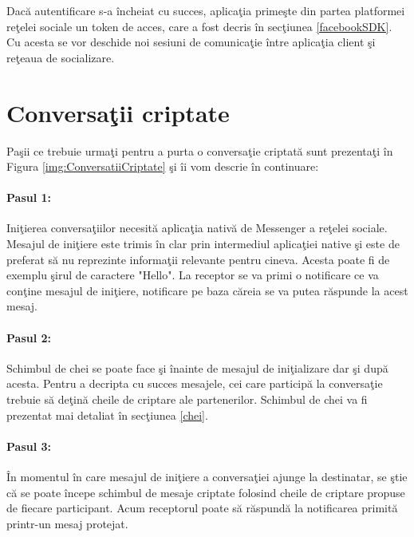 Dac\u{a} autentificare s-a \^{i}ncheiat cu succes, aplica\c{t}ia prime\c{s}te din partea platformei re\c{t}elei sociale un token de acces, care a fost decris \^{i}n sec\c{t}iunea \ref{facebookSDK}. Cu acesta se vor deschide noi sesiuni de comunica\c{t}ie \^{i}ntre aplica\c{t}ia client \c{s}i re\c{t}eaua de socializare.

\section{Conversa\c{t}ii criptate}

Pa\c{s}ii ce trebuie urma\c{t}i pentru a purta o conversa\c{t}ie criptat\u{a} sunt prezenta\c{t}i \^{i}n Figura \ref{img:ConversatiiCriptate} \c{s}i \^{i}i vom descrie \^{i}n continuare:


\paragraph{Pasul 1:}

Ini\c{t}ierea conversa\c{t}iilor necesit\u{a} aplica\c{t}ia nativ\u{a} de Messenger a re\c{t}elei sociale. Mesajul de ini\c{t}iere este trimis \^{i}n clar prin intermediul aplica\c{t}iei native \c{s}i este de preferat s\u{a} nu reprezinte informa\c{t}ii relevante pentru cineva. Acesta poate fi de exemplu \c{s}irul de caractere "Hello". La receptor se va primi o notificare ce va con\c{t}ine mesajul de ini\c{t}iere, notificare pe baza c\u{a}reia se va putea r\u{a}spunde la acest mesaj.

\paragraph{Pasul 2:}

Schimbul de chei se poate face \c{s}i \^{i}nainte de mesajul de ini\c{t}ializare dar \c{s}i dup\u{a} acesta. Pentru a decripta cu succes mesajele, cei care particip\u{a} la conversa\c{t}ie trebuie s\u{a} de\c{t}in\u{a} cheile de criptare ale partenerilor. Schimbul de chei va fi prezentat mai detaliat \^{i}n sec\c{t}iunea \ref{chei}. 

\paragraph{Pasul 3:}

\^{I}n momentul \^{i}n care mesajul de ini\c{t}iere a conversa\c{t}iei ajunge la destinatar, se \c{s}tie c\u{a} se poate \^{i}ncepe schimbul de mesaje criptate folosind cheile de criptare propuse de fiecare participant. Acum receptorul poate s\u{a} r\u{a}spund\u{a} la notificarea primit\u{a} printr-un mesaj protejat.

